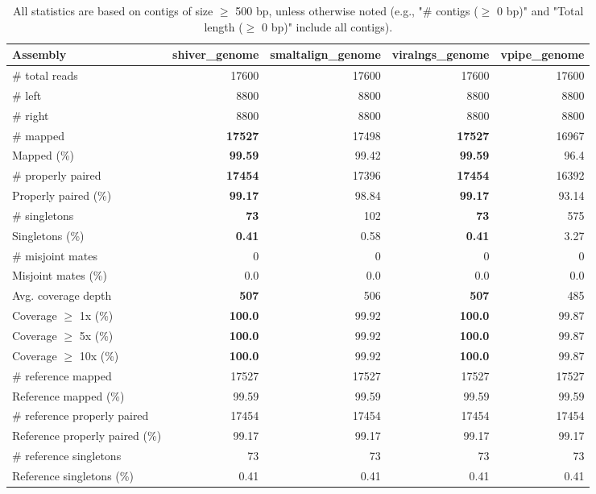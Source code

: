 \documentclass[12pt,a4paper]{article}
\begin{document}
\begin{table}[ht]
\begin{center}
\caption{All statistics are based on contigs of size $\geq$ 500 bp, unless otherwise noted (e.g., "\# contigs ($\geq$ 0 bp)" and "Total length ($\geq$ 0 bp)" include all contigs).}
\begin{tabular}{|l*{4}{|r}|}
\hline
Assembly & shiver\_genome & smaltalign\_genome & viralngs\_genome & vpipe\_genome \\ \hline
\# total reads & 17600 & 17600 & 17600 & 17600 \\ \hline
\# left & 8800 & 8800 & 8800 & 8800 \\ \hline
\# right & 8800 & 8800 & 8800 & 8800 \\ \hline
\# mapped & {\bf 17527} & 17498 & {\bf 17527} & 16967 \\ \hline
Mapped (\%) & {\bf 99.59} & 99.42 & {\bf 99.59} & 96.4 \\ \hline
\# properly paired & {\bf 17454} & 17396 & {\bf 17454} & 16392 \\ \hline
Properly paired (\%) & {\bf 99.17} & 98.84 & {\bf 99.17} & 93.14 \\ \hline
\# singletons & {\bf 73} & 102 & {\bf 73} & 575 \\ \hline
Singletons (\%) & {\bf 0.41} & 0.58 & {\bf 0.41} & 3.27 \\ \hline
\# misjoint mates & 0 & 0 & 0 & 0 \\ \hline
Misjoint mates (\%) & 0.0 & 0.0 & 0.0 & 0.0 \\ \hline
Avg. coverage depth & {\bf 507} & 506 & {\bf 507} & 485 \\ \hline
Coverage $\geq$ 1x (\%) & {\bf 100.0} & 99.92 & {\bf 100.0} & 99.87 \\ \hline
Coverage $\geq$ 5x (\%) & {\bf 100.0} & 99.92 & {\bf 100.0} & 99.87 \\ \hline
Coverage $\geq$ 10x (\%) & {\bf 100.0} & 99.92 & {\bf 100.0} & 99.87 \\ \hline
\# reference mapped & 17527 & 17527 & 17527 & 17527 \\ \hline
Reference mapped (\%) & 99.59 & 99.59 & 99.59 & 99.59 \\ \hline
\# reference properly paired & 17454 & 17454 & 17454 & 17454 \\ \hline
Reference properly paired (\%) & 99.17 & 99.17 & 99.17 & 99.17 \\ \hline
\# reference singletons & 73 & 73 & 73 & 73 \\ \hline
Reference singletons (\%) & 0.41 & 0.41 & 0.41 & 0.41 \\ \hline

\end{tabular}
\end{center}
\end{table}
\end{document}
